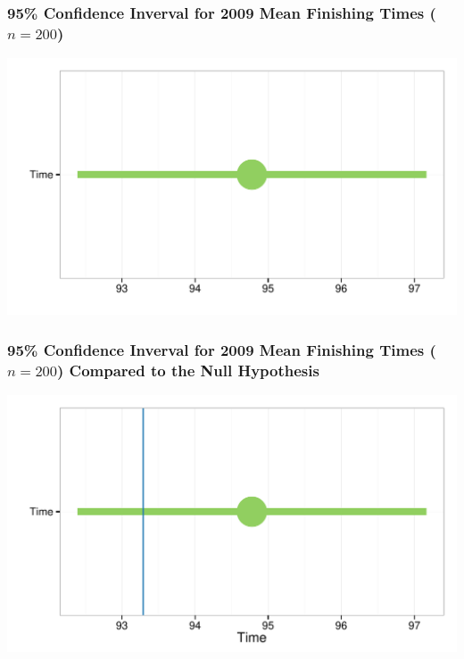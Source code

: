 \documentclass{beamer}\usepackage{graphicx, color}
\makeatletter
\def\maxwidth{ %
  \ifdim\Gin@nat@width>\linewidth
    \linewidth
  \else
    \Gin@nat@width
  \fi
}
\newenvironment{knitrout}{}{} %
\makeatother
\begin{document}
\begin{frame}[fragile]
  \frametitle{95\% Confidence Inverval for 2009 Mean Finishing Times ($n = 200$)}
\begin{knitrout}
\color{fgcolor}

{\centering \includegraphics[width=\maxwidth]{figure/TimeCI} 

}


\end{knitrout}

\end{frame}

\begin{frame}[fragile]
  \frametitle{95\% Confidence Inverval for 2009 Mean Finishing Times ($n = 200$) Compared to the Null Hypothesis}
\begin{knitrout}
\color{fgcolor}

{\centering \includegraphics[width=\maxwidth]{figure/TimeCINull} 

}


\end{knitrout}

\end{frame}
\end{document}
